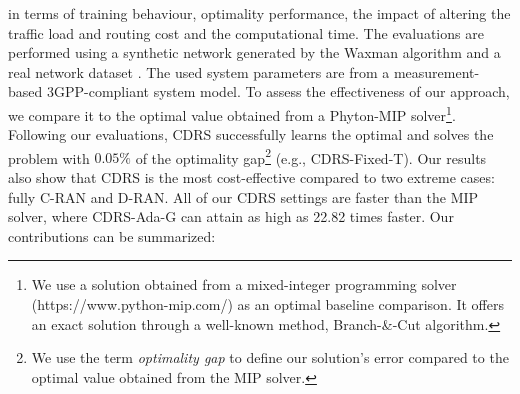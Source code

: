 in terms of training behaviour, optimality performance, the impact of altering the traffic load and routing cost and the computational time. The evaluations are performed using a synthetic network generated by the Waxman algorithm \cite{waxman} and a real network dataset \cite{sndlib}. The used system parameters are from a measurement-based 3GPP-compliant system model. To assess the effectiveness of our approach, we compare it to the optimal value obtained from a Phyton-MIP solver\footnote{We use a solution obtained from a mixed-integer programming solver (https://www.python-mip.com/) as an optimal baseline comparison. It offers an exact solution through a well-known method, Branch-\&-Cut algorithm. }. Following our evaluations, CDRS successfully learns the optimal  and solves the problem with $0.05\%$ of the optimality gap\footnote{We use the term \emph{optimality gap} to define our solution's error compared to the optimal value obtained from the MIP solver.} (e.g., CDRS-Fixed-T).  Our results also show that CDRS is the most cost-effective compared to two extreme cases: fully C-RAN and D-RAN. All of our CDRS settings are  faster than the MIP solver, where CDRS-Ada-G can attain as high as 22.82 times faster. Our contributions can be summarized:
%
